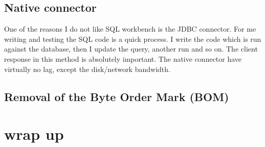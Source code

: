 \subsection{Native connector}
One of the reasons I do not like SQL workbench is the JDBC connector. For me writing and testing the SQL 
code is a quick process. I write the code which is run against the database, then I update the query, 
another run and so on. The client response in this method is absolutely important. The native connector 
have virtually no lag, except the disk/network bandwidth.

\subsection{Removal of the Byte Order Mark (BOM)} 


\section{wrap up}
